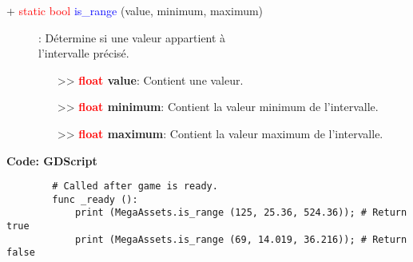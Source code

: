 \documentclass[a4paper, 11pt]{article}
\begin{document}
	\begin{description}
		\item [+ \textcolor{red}{static bool} \textcolor{blue}{is\_range} (value, minimum, maximum)]: 
		Détermine si une valeur appartient à \\l'intervalle précisé.
		\begin{itemize}
			\item[>> \textbf{\textcolor{red}{float} value}:] Contient une valeur.
			\item[>> \textbf{\textcolor{red}{float} minimum}:] Contient la valeur minimum de l'intervalle.
			\item[>> \textbf{\textcolor{red}{float} maximum}:] Contient la valeur maximum de l'intervalle.\\
		\end{itemize}
	\end{description}
	\newpage \textbf{Code: GDScript}
	\begin{lstlisting}
		# Called after game is ready.
		func _ready ():
			print (MegaAssets.is_range (125, 25.36, 524.36)); # Return true
			print (MegaAssets.is_range (69, 14.019, 36.216)); # Return false
	\end{lstlisting}
\end{document}
